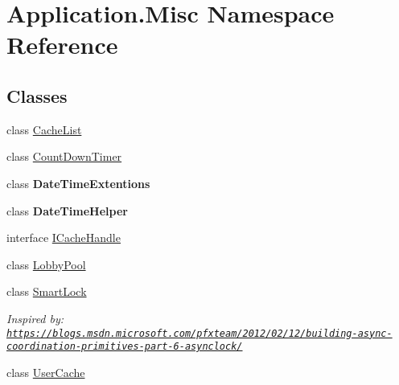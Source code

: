 \hypertarget{namespace_application_1_1_misc}{}\section{Application.\+Misc Namespace Reference}
\label{namespace_application_1_1_misc}
\subsection*{Classes}
\begin{DoxyCompactItemize}
\item 
class \mbox{\hyperlink{class_application_1_1_misc_1_1_cache_list}{Cache\+List}}
\item 
class \mbox{\hyperlink{class_application_1_1_misc_1_1_count_down_timer}{Count\+Down\+Timer}}
\item 
class {\bfseries Date\+Time\+Extentions}
\item 
class {\bfseries Date\+Time\+Helper}
\item 
interface \mbox{\hyperlink{interface_application_1_1_misc_1_1_i_cache_handle}{I\+Cache\+Handle}}
\item 
class \mbox{\hyperlink{class_application_1_1_misc_1_1_lobby_pool}{Lobby\+Pool}}
\item 
class \mbox{\hyperlink{class_application_1_1_misc_1_1_smart_lock}{Smart\+Lock}}
\begin{DoxyCompactList}\small\item\em Inspired by\+: \href{https://blogs.msdn.microsoft.com/pfxteam/2012/02/12/building-async-coordination-primitives-part-6-asynclock/}{\tt https\+://blogs.\+msdn.\+microsoft.\+com/pfxteam/2012/02/12/building-\/async-\/coordination-\/primitives-\/part-\/6-\/asynclock/} \end{DoxyCompactList}\item 
class \mbox{\hyperlink{class_application_1_1_misc_1_1_user_cache}{User\+Cache}}
\end{DoxyCompactItemize}

